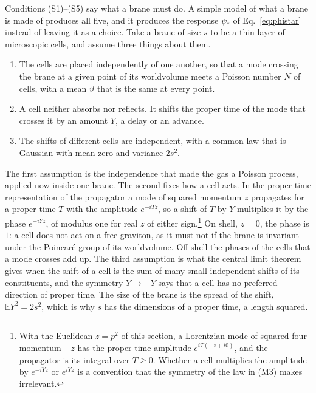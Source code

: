 \documentclass[aps,prd,10pt,twocolumn,superscriptaddress,nofootinbib,floatfix,longbibliography]{revtex4-2}
\newcommand{\bE}{\mathbb{E}}
\begin{document}
Conditions (S1)--(S5) say what a brane must do. A simple model of what a brane is made of produces all five, and it produces the response $\psi_*$ of Eq.~\eqref{eq:phistar} instead of leaving it as a choice. Take a brane of size $s$ to be a thin layer of microscopic cells, and assume three things about them.
\begin{enumerate}[label=\textup{(M\arabic*)},leftmargin=2.4em,itemsep=0.15em]
\item The cells are placed independently of one another, so that a mode crossing the brane at a given point of its worldvolume meets a Poisson number $N$ of cells, with a mean $\vartheta$ that is the same at every point.
\item A cell neither absorbs nor reflects. It shifts the proper time of the mode that crosses it by an amount $Y$, a delay or an advance.
\item The shifts of different cells are independent, with a common law that is Gaussian with mean zero and variance $2s^2$.
\end{enumerate}
The first assumption is the independence that made the gas a Poisson process, applied now inside one brane. The second fixes how a cell acts. In the proper-time representation of the propagator a mode of squared momentum $z$ propagates for a proper time $T$ with the amplitude $e^{-iTz}$, so a shift of $T$ by $Y$ multiplies it by the phase $e^{-iYz}$, of modulus one for real $z$ of either sign.\footnote{With the Euclidean $z=p^2$ of this section, a Lorentzian mode of squared four-momentum $-z$ has the proper-time amplitude $e^{iT(-z+i0)}$, and the propagator is its integral over $T\ge0$. Whether a cell multiplies the amplitude by $e^{-iYz}$ or $e^{iYz}$ is a convention that the symmetry of the law in (M3) makes irrelevant.} On shell, $z=0$, the phase is $1$: a cell does not act on a free graviton, as it must not if the brane is invariant under the Poincar\'e group of its worldvolume. Off shell the phases of the cells that a mode crosses add up. The third assumption is what the central limit theorem gives when the shift of a cell is the sum of many small independent shifts of its constituents, and the symmetry $Y\to-Y$ says that a cell has no preferred direction of proper time. The size of the brane is the spread of the shift, $\bE Y^2=2s^2$, which is why $s$ has the dimensions of a proper time, a length squared.
\end{document}
